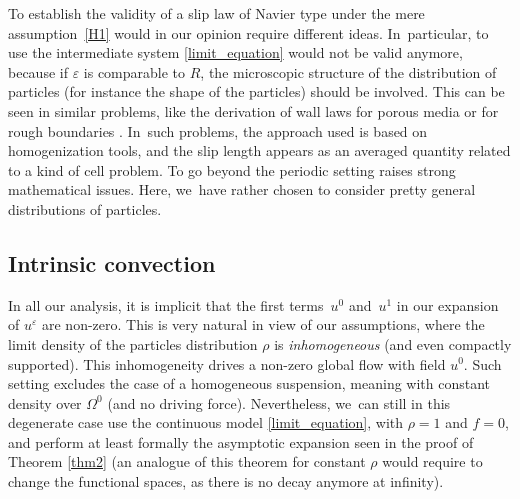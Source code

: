 \documentclass[10pt]{amsart}
\theoremstyle{plain}
\theoremstyle{definition}
\let\eps\varepsilon
\begin{document}
To establish the validity of a slip law of Navier type under the mere assumption~\eqref{H1} would in our opinion require different ideas. In~particular, to use the intermediate system \eqref{limit_equation} would not be valid anymore, because if $\eps$ is comparable to $R$, the microscopic structure of the distribution of particles (for instance the shape of the particles) should be involved. This can be seen in similar problems, like the derivation of wall laws for porous media \cite{Mikelic1996} or for rough boundaries \cite{Mikelic2009,Basson2008}. In~such problems, the approach used is based on homogenization tools, and the slip length appears as an averaged quantity related to a kind of cell problem. To go beyond the periodic setting raises strong mathematical issues. Here, we~have rather chosen to consider pretty general distributions of particles.

\subsection{Intrinsic convection} \label{subsecintrinsic}
In all our analysis, it is implicit that the first terms~$u^0$ and~$u^1$ in our expansion of $u^\eps$ are non-zero. This is very natural in view of our assumptions, where the limit density of the particles distribution $\rho$ is {\em inhomogeneous} (and even compactly supported). This inhomogeneity drives a non-zero global flow with field $u^0$. Such setting excludes the case of a homogeneous suspension, meaning with constant density over
$\Omega^0$ (and no driving force). Nevertheless, we~can still in this degenerate case use the continuous model \eqref{limit_equation}, with $\rho=1$ and $f=0$, and perform at least formally the asymptotic expansion seen in the proof of Theorem \ref{thm2} (an analogue of this theorem for constant $\rho$ would require to change the functional spaces, as there is no decay anymore at infinity).
\end{document}
